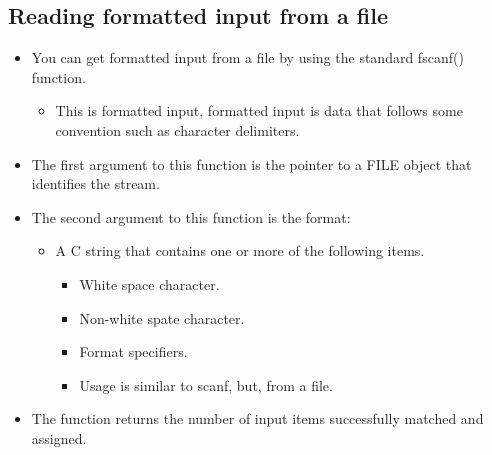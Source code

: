 \subsection{Reading formatted input from a file}
\begin{itemize}
    \item You can get formatted input from a file by using the standard fscanf() function.
        \begin{itemize}
            \item This is formatted input, formatted input is data that follows some convention such as character delimiters.
        \end{itemize}

    \item The first argument to this function is the pointer to a FILE object that identifies the stream.
    \item The second argument to this function is the format:
        \begin{itemize}
            \item A C string that contains one or more of the following items.
                \begin{itemize}
                    \item White space character.
                    \item Non-white spate character.
                    \item Format specifiers.
                    \item Usage is similar to scanf, but, from a file.
                \end{itemize}
        \end{itemize}
    
    \item The function returns the number of input items successfully matched and assigned.

\end{itemize}


